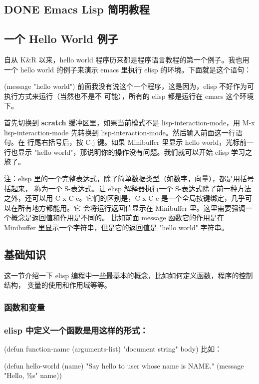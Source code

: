 \documentclass[11pt]{ctexart}
\begin{document}
{{{{\subsection{{\bfseries\sffamily DONE} Emacs Lisp 简明教程}
\label{sec:org36752d8}
\subsection{一个 Hello World 例子}
\label{sec:org621d694}

自从 K\&R 以来，hello world 程序历来都是程序语言教程的第一个例子。我也用一个
hello world 的例子来演示 emacs 里执行 elisp 的环境。下面就是这个语句：

(message "hello world")
前面我没有说这个一个程序，这是因为，elisp 不好作为可执行方式来运行（当然也不是不
可能），所有的 elisp 都是运行在 emacs 这个环境下。

首先切换到 \textbf{scratch} 缓冲区里，如果当前模式不是 lisp-interaction-mode，用 M-x
lisp-interaction-mode 先转换到 lisp-interaction-mode。然后输入前面这一行语句。在
行尾右括号后，按 C-j 键。如果 Minibuffer 里显示 hello world，光标前一行也显示
"hello world"，那说明你的操作没有问题。我们就可以开始 elisp 学习之旅了。

注：elisp 里的一个完整表达式，除了简单数据类型（如数字，向量），都是用括号括起来，
称为一个 S-表达式。让 elisp 解释器执行一个 S-表达式除了前一种方法之外，还可以用
C-x C-e。它们的区别是，C-x C-e 是一个全局按键绑定，几乎可以在所有地方都能用。它
会将运行返回值显示在 Minibuffer 里。这里需要强调一个概念是返回值和作用是不同的。
比如前面 message 函数它的作用是在 Minibuffer 里显示一个字符串，但是它的返回值是
"hello world" 字符串。

\subsection{基础知识}
\label{sec:orgd88a577}

这一节介绍一下 elisp 编程中一些最基本的概念，比如如何定义函数，程序的控制结构，
变量的使用和作用域等等。

\subsubsection{函数和变量}
\label{sec:orge466368}
\subsubsection{elisp 中定义一个函数是用这样的形式：}
\label{sec:org02b73fe}
(defun function-name (arguments-list)
"document string"
body)
比如：
\begin{SCR}
(defun hello-world (name)
"Say hello to user whose name is NAME."
(message "Hello, \%s" name))
\end{SCR}

}}}}
\end{document}

